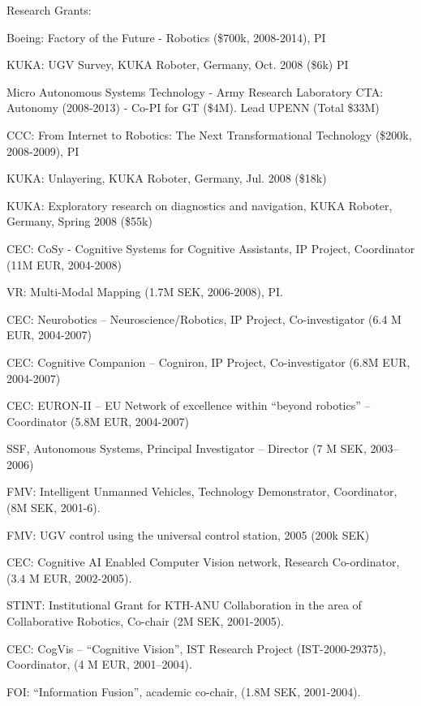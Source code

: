 \documentclass{article}
\begin{document}
\begin{cv}
\begin{cvlist}{Research Grants:}
\item Boeing: Factory of the Future - Robotics (\$700k, 2008-2014), PI
\item KUKA: UGV Survey, KUKA Roboter, Germany, Oct. 2008 (\$6k)  PI%
\item Micro Autonomous Systems Technology - Army Research Laboratory
  CTA: Autonomy (2008-2013) - Co-PI for GT (\$4M). Lead UPENN (Total \$33M) %
\item CCC: From Internet to Robotics: The Next Transformational
  Technology (\$200k, 2008-2009), PI %
\item KUKA: Unlayering, KUKA Roboter, Germany, Jul. 2008 (\$18k) %
\item KUKA: Exploratory research on diagnostics and navigation, KUKA
  Roboter, Germany, Spring 2008 (\$55k)%
\item CEC: CoSy - Cognitive Systems for Cognitive Assistants, IP
  Project, Coordinator (11M EUR, 2004-2008)
\item VR: Multi-Modal Mapping (1.7M SEK, 2006-2008), PI.%
\item CEC: Neurobotics -- Neuroscience/Robotics, IP Project,
  Co-investigator (6.4 M EUR, 2004-2007)%
\item CEC: Cognitive Companion -- Cogniron, IP Project,
  Co-investigator (6.8M EUR, 2004-2007) %
\item CEC: EURON-II -- EU Network of excellence within ``beyond
  robotics''  -- Coordinator (5.8M EUR, 2004-2007) %
\item SSF, Autonomous Systems, Principal Investigator -- Director  (7
  M SEK, 2003--2006) %
\item FMV: Intelligent Unmanned Vehicles, Technology Demonstrator,
  Coordinator, (8M SEK, 2001-6). %
\item FMV: UGV control using the universal control station, 2005 (200k
  SEK) %
\item CEC: Cognitive AI Enabled Computer Vision network, Research
  Co-ordinator, (3.4 M EUR, 2002-2005). %
\item STINT: Institutional Grant for KTH-ANU Collaboration in the area
  of Collaborative Robotics, Co-chair (2M SEK, 2001-2005).%
\item CEC: CogVis -- ``Cognitive Vision'', IST Research Project
  (IST-2000-29375), Coordinator, (4 M EUR, 2001--2004).%
\item FOI: ``Information Fusion'', academic co-chair,  (1.8M SEK, 2001-2004).%

\end{cvlist}
\end{cv}
\end{document}
